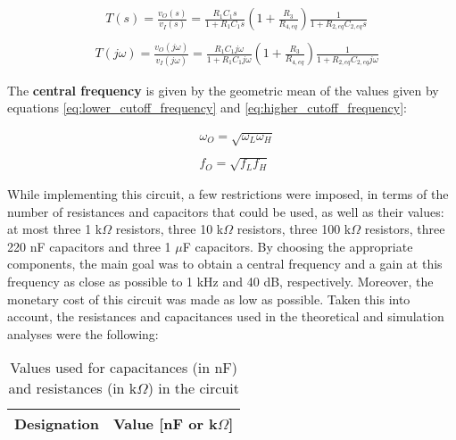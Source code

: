 \begin{equation} \label{eq:gain}
  \begin{aligned}
    &\;\;\;T(s)=\frac{v_O(s)}{v_I(s)}=\frac{R_1C_1s}{1+R_1C_1s}\left(1+\frac{R_3}{R_{4,eq}}\right)\frac{1}{1+R_{2,eq}C_{2,eq}s} \\
    \\
    &T(j\omega)=\frac{v_O(j\omega)}{v_I(j\omega)}=\frac{R_1C_1j\omega}{1+R_1C_1j\omega}\left(1+\frac{R_3}{R_{4,eq}}\right)\frac{1}{1+R_{2,eq}C_{2,eq}j\omega}  
  \end{aligned}
\end{equation}

The \textbf{central frequency} is given by the geometric mean of the values given by equations \ref{eq:lower_cutoff_frequency} and \ref{eq:higher_cutoff_frequency}:

\begin{equation} \label{eq:central_frequency}
  \begin{aligned}
    &\omega_O=\sqrt{\omega_L\omega_H} \\
    \\
    &f_O=\sqrt{f_Lf_H} 
  \end{aligned}
\end{equation}

While implementing this circuit, a few restrictions were imposed, in terms of the number of resistances and capacitors that could be used, as well as their values: at most three 1 k$\Omega$ resistors, three 10 k$\Omega$ resistors, three 100 k$\Omega$ resistors, three 220 nF capacitors and three 1 $\mu$F capacitors. By choosing the appropriate components, the main goal was to obtain a central frequency and a gain at this frequency as close as possible to 1 kHz and 40 dB, respectively. Moreover, the monetary cost of this circuit was made as low as possible. Taken this into account, the resistances and capacitances used in the theoretical and simulation analyses were the following:

\begin{table}[H]
  \centering
  \begin{tabular}{|c|c|}
    \hline    
        {\bf Designation} & {\bf Value [nF or k$\Omega$]} \\ \hline
        
  \end{tabular}
  \caption{Values used for capacitances (in nF) and resistances (in k$\Omega$) in the circuit}
  \label{tab:chosen_values}
\end{table}

